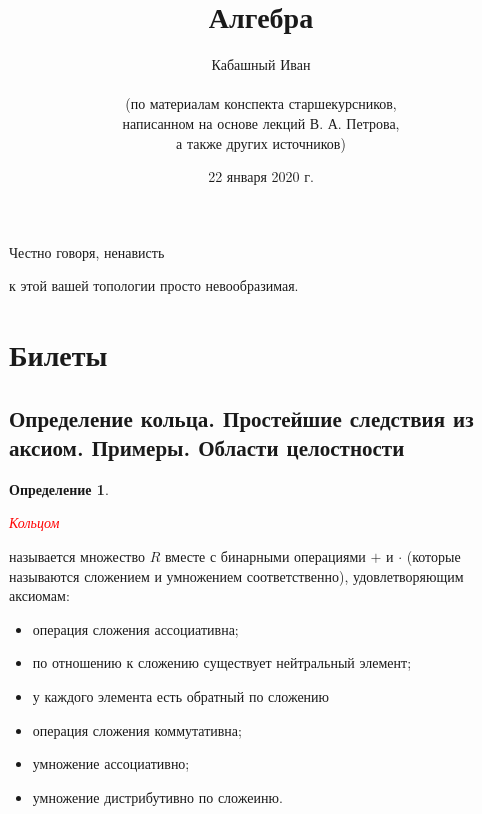 \documentclass[a4paper,100pt]{article}
\title{Алгебра}
\author{Кабашный Иван\\ \\ (по материалам конспекта старшекурсников, \\ написанном на основе лекций В. А. Петрова,\\ а также других источников)}
\date{22 января 2020 г.}
\theoremstyle{indented}
\theoremstyle{definition}
\newtheorem{defn}{Определение}
\theoremstyle{remark}
\begin{document}
\newcommand{\resetexlcounters}{%
  \setcounter{exl}{0}%
} 

\newcommand{\resetremarkcounters}{%
  \setcounter{remark}{0}%
} 

\newcommand{\reseconscounters}{%
  \setcounter{cons}{0}%
} 

\newcommand{\resetall}{%
    \resetexlcounters
    \resetremarkcounters
    \reseconscounters%
}

\maketitle 

\newpage

\hypertarget{t1}{Честно говоря, ненависть} к этой вашей топологии просто невообразимая.
\tableofcontents

\newpage



\section{Билеты}



\subsection{Определение кольца. Простейшие следствия из аксиом. Примеры. Области целостности}

\medskip

\begin{defn}
    \hypertarget{n1}{\textcolor{red}{\textit{Кольцом}}} называется множество $R$ вместе с бинарными операциями $+$ и $\cdot$ (которые называются сложением и умножением соответственно), удовлетворяющим аксиомам:\

    \begin{itemize}
        \item операция сложения ассоциативна;
        \item по отношению к сложению существует нейтральный элемент;
        \item у каждого элемента есть обратный по сложению
        \item операция сложения коммутативна;
        \item умножение ассоциативно;
        \item умножение дистрибутивно по сложеиню.
    \end{itemize}
\end{defn}
\end{document}
